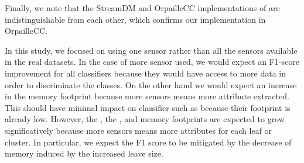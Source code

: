 Finally, we note that the StreamDM and OrpailleCC implementations of
\naivebayes are indistinguishable from each other, which confirms our
implementation in OrpailleCC.

In this study, we focused on using one sensor rather than all the sensors
available in the real datasets. In the case of more sensor used, we would expect
an F1-score improvement for all classifiers because they would have access to
more data in order to discriminate the classes. On the other hand we would
expect an increase in the memory footprint because more sensors means more
attribute extracted. This should have minimal impact on classifier such as
\naivebayes because their footprint is already low. However, the
\mondrianforest, the \hoeffdingtree, and \mcnn memory footprints are expected to
grow significatively because more sensors means more attributes for each leaf or
cluster. In particular, we expect the \mondrianforest F1 score to be mitigated
by the decrease of memory induced by the increased leave size.

